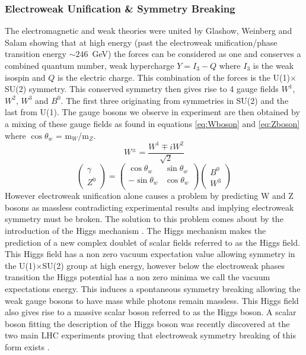     \subsubsection*{Electroweak Unification \& Symmetry Breaking}
    The electromagnetic and weak theories were united by Glashow, Weinberg and Salam \cite{Glashow1961579,PhysRevLett.19.1264,Salam:1968rm} showing that at high energy (past the electroweak unification/phase transition energy $\sim246$~GeV) the forces can be considered as one and conserves a combined quantum number, weak hypercharge $Y = I_{3} - Q$ where $I_{3}$ is the weak isospin and $Q$ is the electric charge. This combination of the forces is the U(1)$\times$SU(2) symmetry. This conserved symmetry then gives rise to 4 gauge fields $W^{1}$, $W^{2}$, $W^{3}$ and $B^{0}$. The first three originating from symmetries in SU(2) and the last from U(1). The gauge bosons we observe in experiment are then obtained by a mixing of these gauge fields as found in equations \ref{eq:Wboson} and \ref{eq:Zboson} where $\cos{\theta_{w}}$ = m$_{W}$/m$_{Z}$.
    \begin{equation}
        W^{\pm} = \frac{W^{1} \mp iW^{2}}{\sqrt{2}}
      \label{eq:Wboson}
    \end{equation}
    \begin{equation}
        \left(\begin{array}{c} \gamma \\ Z^{0}\end{array}\right)
          = \left( \begin{array}{cc} 
              \cos\theta_{w} & \sin\theta_{w} \\  
              -\sin\theta_{w} & \cos\theta_{w} \\ 
            \end{array} \right)
            \left(\begin{array}{c} B^{0} \\ W^{3}\end{array}\right)
      \label{eq:Zboson}
    \end{equation}
    However electroweak unification alone causes a problem by predicting W and Z bosons as massless contradicting experimental results and implying electroweak symmetry must be broken. The solution to this problem comes about by the introduction of the Higgs mechanism \cite{PhysRevLett.13.321,PhysRevLett.13.508,PhysRevLett.13.585}. The Higgs mechanism makes the prediction of a new complex doublet of scalar fields referred to as the Higgs field. This Higgs field has a non zero vacuum expectation value allowing symmetry in the U(1)$\times$SU(2) group at high energy, however below the electroweak phases transition the Higgs potential has a non zero minima we call the vacuum expectations energy. This induces a spontaneous symmetry breaking allowing the weak gauge bosons to have mass while photons remain massless. This Higgs field also gives rise to a massive scalar boson referred to as the Higgs boson. A scalar boson fitting the description of the Higgs boson was recently discovered at the two main LHC experiments proving that electroweak symmetry breaking of this form exists \cite{Aad20121,Chatrchyan201230}. 


